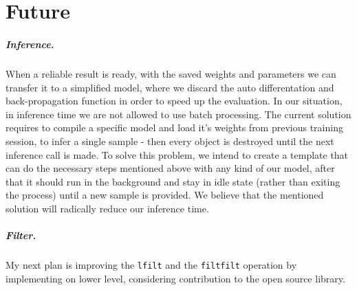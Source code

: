 \chapter{Future}

\paragraph{Inference.}
When a reliable result is ready, with the saved weights and parameters we can transfer it to a simplified model, where we discard the auto differentation and back-propagation function in order to speed up the evaluation.
In our situation, in inference time we are not allowed to use batch processing.
The current solution requires to compile a specific model and load it's weights from previous training session, to infer a single sample - then every object is destroyed until the next inference call is made.
To solve this problem, we intend to create a template that can do the necessary steps mentioned above with any kind of our model, after that it should run in the background and stay in idle state (rather than exiting the process) until a new sample is provided.
We believe that the mentioned solution will radically reduce our inference time.

\paragraph{Filter.}
My next plan is improving the \texttt{lfilt} and the \texttt{filtfilt} operation by implementing on lower level, considering contribution to the open source library.
